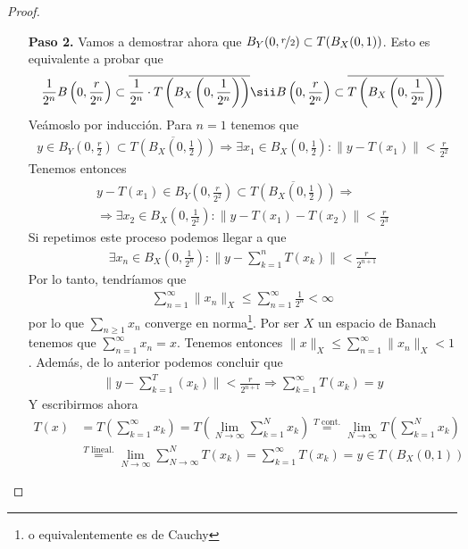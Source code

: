 \begin{teo}
\begin{proof}
\begin{itemize}
            \item[\textbf{Paso 2.}] Vamos a demostrar ahora que $B_Y(0,\nicefrac{r}{2})\subset T(B_X(0,1))$. Esto es equivalente a probar que 
            \begin{gather*}
                \frac{1}{2^n} B\left(0, \frac{r}{2^n}\right) \subset \overline{\frac{1}{2^n} \cdot T\left(B_X\left(0,\frac{1}{2^n}\right)\right)} \sii B\left(0, \frac{r}{2^n}\right) \subset \overline{T\left(B_X\left(0,\frac{1}{2^n}\right)\right)}
            \end{gather*}
            Veámoslo por inducción. Para $n=1$ tenemos que
            \begin{gather*}
                y\in B_Y\left(0,\frac{r}{2}\right) \subset \overline{T\left(B_X\left(0,\frac{1}{2}\right)\right)} \Rightarrow \exists x_1 \in B_X\left(0,\frac{1}{2}\right) : \|y-T(x_1)\| < \frac{r}{2^2}
            \end{gather*}
            Tenemos entonces 
            \begin{gather*}
                y-T(x_1) \in B_Y\left(0,\frac{r}{2^2}\right) \subset \overline{T\left(B_X\left(0,\frac{1}{2}\right)\right)} \Rightarrow\\
                \Rightarrow \exists x_2 \in B_X\left(0,\frac{1}{2^2}\right) : \|y-T(x_1) - T(x_2)\| < \frac{r}{2^3}
            \end{gather*}
            Si repetimos este proceso podemos llegar a que 
            \begin{gather*}
                \exists x_n \in B_X\left(0,\frac{1}{2^n}\right) : \|y-\sum_{k=1}^n T(x_k)\| < \frac{r}{2^{n+1}}
            \end{gather*}
            Por lo tanto, tendríamos que 
            \begin{gather*}
                \sum_{n=1}^\infty \|x_n\|_X \leq \sum_{n=1}^\infty \frac{1}{2^n} < \infty
            \end{gather*}
            por lo que $\sum\limits_{n\geq 1} x_n$ converge en norma\footnote{o equivalentemente es de Cauchy}. Por ser $X$ un espacio de Banach tenemos que $\sum\limits_{n=1}^\infty x_n = x$. Tenemos entonces $\|x\|_X \leq \sum\limits_{n=1}^\infty \|x_n\|_X < 1$. Además, de lo anterior podemos concluir que
            \begin{gather*}
                \|y-\sum_{k=1}^ T(x_k)\| < \frac{r}{2^{n+1}} \Rightarrow \sum_{k=1}^\infty T(x_k) = y
            \end{gather*}
            Y escribirmos ahora
            \begin{align*}
                T(x) &= T\left(\sum_{k=1}^\infty x_k\right) = T\left(\lim_{N\to \infty}\sum_{k=1}^N x_k\right) \overset{T \text{ cont.}}{=} \lim_{N\to \infty}T\left(\sum_{k=1}^N x_k\right) \\
                &\overset{T \text{ lineal.}}{=} \lim_{N\to \infty} \sum_{N\to \infty}^N T(x_k) = \sum_{k=1}^\infty T(x_k) = y\in T(B_X(0,1))
            \end{align*}
        \end{itemize}
    \end{proof}
\end{teo}





